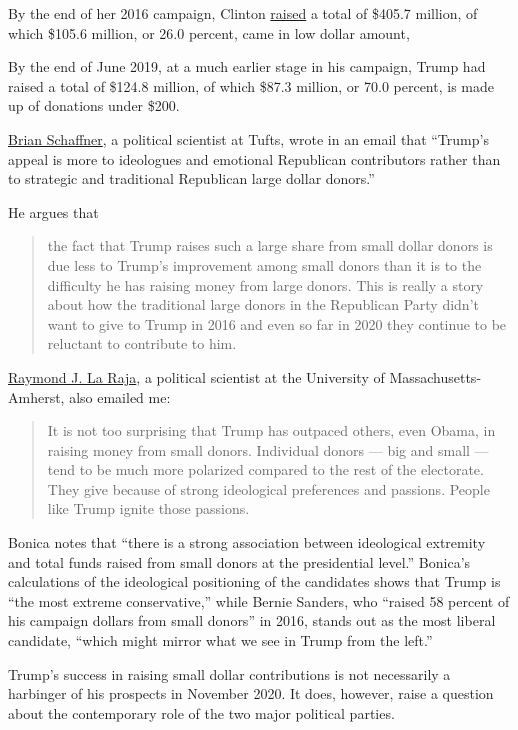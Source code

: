 By the end of her 2016 campaign, Clinton
\href{https://www.fec.gov/data/candidate/P00003392/}{raised} a total of
\$405.7 million, of which \$105.6 million, or 26.0 percent, came in low
dollar amount,

By the end of June 2019, at a much earlier stage in his campaign, Trump
had raised a total of \$124.8 million, of which \$87.3 million, or 70.0
percent, is made up of donations under \$200.

\href{https://as.tufts.edu/politicalscience/people/faculty/schaffner}{Brian
Schaffner}, a political scientist at Tufts, wrote in an email that
``Trump's appeal is more to ideologues and emotional Republican
contributors rather than to strategic and traditional Republican large
dollar donors.''

He argues that

\begin{quote}
the fact that Trump raises such a large share from small dollar donors
is due less to Trump's improvement among small donors than it is to the
difficulty he has raising money from large donors. This is really a
story about how the traditional large donors in the Republican Party
didn't want to give to Trump in 2016 and even so far in 2020 they
continue to be reluctant to contribute to him.
\end{quote}

\href{https://polsci.umass.edu/people/ray-la-raja}{Raymond J. La Raja},
a political scientist at the University of Massachusetts-Amherst, also
emailed me:

\begin{quote}
It is not too surprising that Trump has outpaced others, even Obama, in
raising money from small donors. Individual donors --- big and small ---
tend to be much more polarized compared to the rest of the electorate.
They give because of strong ideological preferences and passions. People
like Trump ignite those passions.
\end{quote}

Bonica notes that ``there is a strong association between ideological
extremity and total funds raised from small donors at the presidential
level.'' Bonica's calculations of the ideological positioning of the
candidates shows that Trump is ``the most extreme conservative,'' while
Bernie Sanders, who ``raised 58 percent of his campaign dollars from
small donors'' in 2016, stands out as the most liberal candidate,
``which might mirror what we see in Trump from the left.''

Trump's success in raising small dollar contributions is not necessarily
a harbinger of his prospects in November 2020. It does, however, raise a
question about the contemporary role of the two major political parties.

